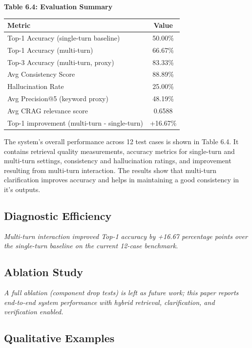 \documentclass[conference]{IEEEtran}
\begin{document}
\begin{table}[htbp]
\centering
\textbf{Table 6.4: Evaluation Summary}\\[2pt]
\begin{tabular}{|p{3.8cm}|c|}
\hline
\textbf{Metric} & \textbf{Value} \\
\hline
Top-1 Accuracy (single-turn baseline) & 50.00\% \\
\hline
Top-1 Accuracy (multi-turn) & 66.67\% \\
\hline
Top-3 Accuracy (multi-turn, proxy) & 83.33\% \\
\hline
Avg Consistency Score & 88.89\% \\
\hline
Hallucination Rate & 25.00\% \\
\hline
Avg Precision@5 (keyword proxy) & 48.19\% \\
\hline
Avg CRAG relevance score & 0.6588 \\
\hline
Top-1 improvement (multi-turn - single-turn) & +16.67\% \\
\hline
\end{tabular}
\par\medskip
\noindent The system's overall performance across 12 test cases is shown in Table 6.4. It contains retrieval quality measurements, accuracy metrics for single-turn and multi-turn settings, consistency and hallucination ratings, and improvement resulting from multi-turn interaction. The results show that multi-turn clarification improves accuracy and helps in maintaining a good consistency in it's outputs.
\label{tab4}
\end{table}

\subsection{Diagnostic Efficiency}

\textit{Multi-turn interaction improved Top-1 accuracy by +16.67 percentage points over the single-turn baseline on the current 12-case benchmark.}

\subsection{Ablation Study}

\textit{A full ablation (component drop tests) is left as future work; this paper reports end-to-end system performance with hybrid retrieval, clarification, and verification enabled.}

\subsection{Qualitative Examples}
\end{document}
